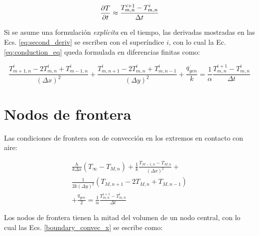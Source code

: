 \documentclass[11pt]{article}
\begin{document}
\begin{equation}
	\pdv{T}{t} \approx \frac{T_{m, n}^{i + 1} - T_{m, n}^i}{\Delta t}
\end{equation}

Si se asume una formulación \emph{explícita} en el tiempo, las derivadas mostradas en las Ecs. \eqref{eq:second_deriv} se escriben con el superíndice $i$, con lo cual la Ec. \eqref{eq:conduction_eq} queda formulada en diferencias finitas como:

\begin{equation}
	\frac{T_{m + 1, n}^i - 2 T_{m, n}^i + T_{m - 1, n}^i}{\left(\Delta x \right)^2} + \frac{T_{m, n + 1}^i - 2 T_{m, n}^i + T_{m, n - 1}^i}{\left(\Delta y \right)^2} + \frac{\dot{q_{gen}}}{k} = \frac{1}{\alpha} \frac{T_{m, n}^{i + 1} - T_{m, n}^i}{\Delta t}
\end{equation}

\section{Nodos de frontera}

Las condiciones de frontera son de convección en los extremos en contacto con aire: 

\begin{multline}
        \frac{h}{k \Delta x} (T_{\infty} - T_{M, n}) + \frac{1}{k} \frac{T_{M - 1, n} - T_{M, n}}{\left( \Delta x \right)^2} + \\
       	\frac{1}{2 k \left( \Delta y \right)^2} \left( T_{M, n + 1} - 2 T_{M, n} + T_{M, n - 1} \right) \\ +
      	\frac{\dot{q_{gen}}}{2} = \frac{1}{\alpha} \frac{T_{m, n}^{i + 1} - T_{m, n}^i}{\Delta t} 
\end{multline}

Los nodos de frontera tienen la mitad del volumen de un nodo central, con lo cual las Ecs. \eqref{boundary_convec_x} se escribe como:
\end{document}
